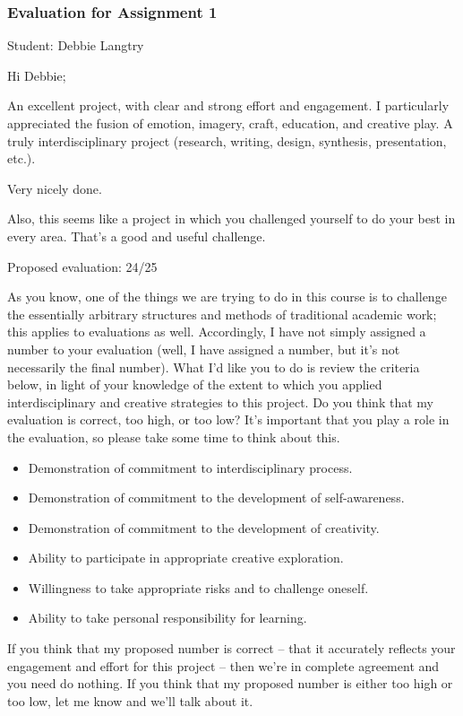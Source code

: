 \documentclass[letterpaper,10pt,DIV=9,headsepline]{scrreprt}
\begin{document}
\newpage

\subsubsection{Evaluation for Assignment 1}

Student: Debbie Langtry

\bigskip
Hi Debbie;

An excellent project, with clear and strong effort and engagement. I
particularly appreciated the fusion of emotion, imagery, craft, education, and
creative play. A truly interdisciplinary project (research, writing, design, synthesis, presentation, etc.).

Very nicely done.

Also, this seems like a project in which you challenged yourself to do your best in every area. That's a good and useful challenge. 



\bigskip
Proposed evaluation: 24/25

\bigskip
As you know, one of the things we are trying to do in this course is
to challenge the essentially arbitrary structures and methods of
traditional academic work; this applies to evaluations as well.
Accordingly, I have not simply assigned a number to your evaluation
(well, I have assigned a number, but it's not necessarily the final
number). What I'd like you to do is review the criteria below, in
light of your knowledge of the extent to which you applied
interdisciplinary and creative strategies to this project. Do you
think that my evaluation is correct, too high, or too low? It's
important that you play a role in the evaluation, so please take some
time to think about this.

\begin{itemize}
\item Demonstration of commitment to interdisciplinary process.
\item Demonstration of commitment to the development of self-awareness.
\item Demonstration of commitment to the development of creativity.
\item Ability to participate in appropriate creative exploration.
\item Willingness to take appropriate risks and to challenge oneself.
\item Ability to take personal responsibility for learning.
\end{itemize}

If you think that my proposed number is correct -- that it accurately
reflects your engagement and effort for this project -- then we're in
complete agreement and you need do nothing. If you think that my
proposed number is either too high or too low, let me know and we'll
talk about it.
\end{document}
